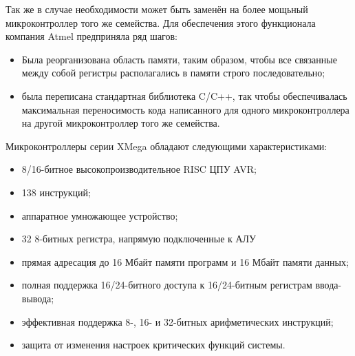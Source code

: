 Так же в случае необходимости может быть заменён на более мощьный микроконтроллер того же семейства.
Для обеспечения этого функционала компания Atmel предприняла ряд шагов:
\begin{itemize}
    \item{} Была реорганизована область памяти, таким образом, чтобы все связанные между
            собой регистры располагались в памяти строго последовательно;
    \item{} была переписана стандартная библиотека C/C++, так чтобы обеспечивалась
            максимальная переносимость кода написанного для одного микроконтроллера
            на другой микроконтроллер того же семейства.
\end{itemize}

Микроконтроллеры серии XMega обладают следующими характеристиками:
\begin{itemize}
	\item{} 8/16-битное высокопроизводительное RISC ЦПУ AVR;
	\item{} 138 инструкций;
	\item{} аппаратное умножающее устройство;
	\item{} 32 8-битных регистра, напрямую подключенные к АЛУ
	\item{} прямая адресация до 16 Мбайт памяти программ и 16 Мбайт памяти данных;
	\item{} полная поддержка 16/24-битного доступа к 16/24-битным регистрам ввода-вывода;
	\item{} эффективная поддержка 8-, 16- и 32-битных арифметических инструкций;
	\item{} защита от изменения настроек критических функций системы.
\end{itemize}

